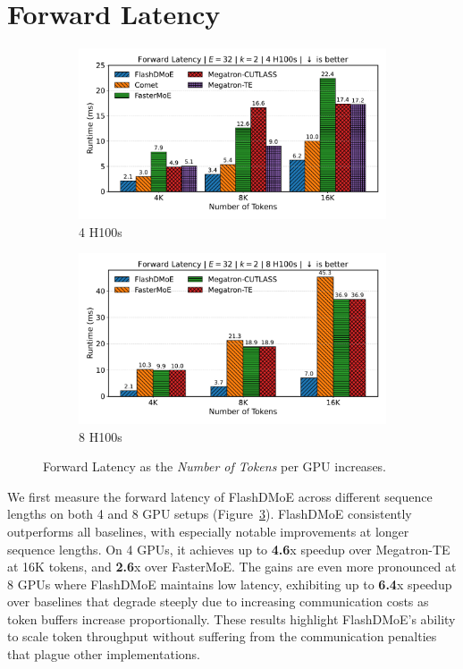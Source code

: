 \section{Forward Latency}\label{sec:forward-latency}
\begin{figure}[!h]
    \centering
    \begin{subfigure}{0.49\textwidth}
        \centering
        \includegraphics[width=\linewidth, keepaspectratio]{figures/scaling_tokens}
        \caption{4 H100s}
        \label{sub:4gl}
    \end{subfigure}
    \begin{subfigure}{0.49\textwidth}
        \centering
        \includegraphics[width=\linewidth, keepaspectratio]{figures/scaling_tokens_8}
        \caption{8 H100s}
        \label{sub:8gl}
    \end{subfigure}
    \caption{Forward Latency as the \emph{Number of Tokens} per GPU increases.}
    \label{fig:fl}
\end{figure}
We first measure the forward latency of FlashDMoE across different sequence lengths on both 4 and 8 GPU setups
(Figure~\ref{fig:fl}).
FlashDMoE consistently outperforms all baselines,
with especially notable improvements at longer sequence lengths.
On 4 GPUs, it achieves up to \textbf{4.6}x speedup over Megatron-TE at 16K tokens,
and \textbf{2.6}x over FasterMoE.
The gains are even more pronounced at 8 GPUs
where FlashDMoE maintains low latency, exhibiting up to \textbf{6.4}x speedup over baselines that
degrade steeply due to increasing communication costs as token buffers increase proportionally.
These results highlight FlashDMoE’s ability to scale token throughput without suffering from the communication
penalties that plague other implementations.
